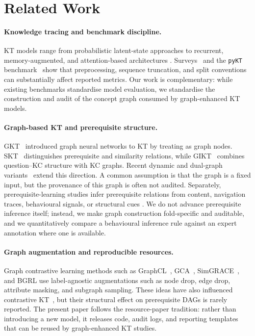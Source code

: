 \section{Related Work}
\label{sec:related}
\paragraph{Knowledge tracing and benchmark discipline.}
KT models range from probabilistic latent-state approaches
\cite{corbett1995bkt} to recurrent, memory-augmented, and
attention-based architectures
\cite{piech2015dkt,zhang2017dkvmn,ghosh2020akt,liu2023simplekt}.
Surveys~\cite{abdelrahman2023kt_survey} and the
\texttt{pyKT} benchmark~\cite{liu2022pykt} show that preprocessing,
sequence truncation, and split conventions can substantially affect
reported metrics. Our work is complementary: while existing benchmarks
standardise model evaluation, we standardise the construction and audit
of the concept graph consumed by graph-enhanced KT models.
\paragraph{Graph-based KT and prerequisite structure.}
GKT~\cite{nakagawa2019gkt} introduced graph neural networks to KT by
treating \KCs{} as graph nodes. SKT~\cite{tong2020skt} distinguishes
prerequisite and similarity relations, while GIKT~\cite{yang2021gikt}
combines question--KC structure with KC graphs. Recent dynamic and
dual-graph variants~\cite{dygkt2024,dgekt2024} extend this direction.
A common assumption is that the graph is a fixed input, but the
provenance of this graph is often not audited. Separately,
prerequisite-learning studies infer prerequisite relations from
content, navigation traces, behavioural signals, or structural cues
\cite{bai2025survey}. We do not advance prerequisite inference itself;
instead, we make graph construction fold-specific and auditable, and
we quantitatively compare a behavioural inference rule against an
expert annotation where one is available.
\paragraph{Graph augmentation and reproducible resources.}
Graph contrastive learning methods such as GraphCL~\cite{you2020graphcl},
GCA~\cite{zhu2021gca}, SimGRACE~\cite{xia2022simgrace}, and BGRL
\cite{thakoor2021bgrl} use label-agnostic augmentations such as node
drop, edge drop, attribute masking, and subgraph sampling. These ideas
have also influenced contrastive KT~\cite{lee2022cl4kt,song2022biclkt,
deckt2025}, but their structural effect on prerequisite DAGs is rarely
reported. The present paper follows the resource-paper tradition:
rather than introducing a new model, it releases code, audit logs, and
reporting templates that can be reused by graph-enhanced KT studies.
